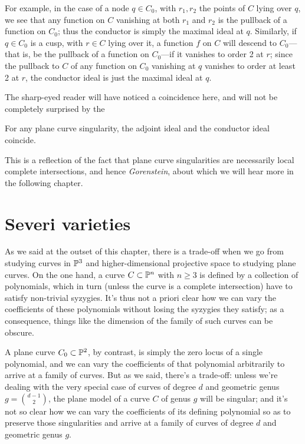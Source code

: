 For example, in the case of a node $q \in C_0$, with $r_1,r_2$ the points of $C$ lying over $q$, we see that any function on $C$ vanishing at both $r_1$ and $r_2$ is the pullback of a function on $C_0$; thus the conductor is simply the maximal ideal at $q$. Similarly, if $q \in C_0$ is a cusp, with $r \in C$ lying over it, a function $f$ on $C$ will descend to $C_0$---that is, be the pullback of a function on $C_0$---if it vanishes to order 2 at $r$; since the pullback to $C$ of any function on $C_0$ vanishing at $q$ vanishes to order at least 2 at $r$, the conductor ideal is just the maximal ideal at $q$.

The sharp-eyed reader will have noticed a coincidence here, and will not be completely surprised by the

\begin{theorem}
For any plane curve singularity, the adjoint ideal and the conductor ideal coincide.
\end{theorem}

This is a reflection of the fact that plane curve singularities are necessarily local complete intersections, and hence \emph{Gorenstein}, about which we will hear more in the following chapter.

\section{Severi varieties}

As we said at the outset of this chapter, there is a trade-off when we go from studying curves in ${\mathbb P}^3$ and higher-dimensional projective space to studying plane curves. On the one hand, a curve $C \subset {\mathbb P}^n$ with $n \geq 3$ is defined by a collection of polynomials, which in turn (unless the curve is a complete intersection) have to satisfy non-trivial syzygies. It's thus not a priori clear how we can vary the coefficients of these polynomials without losing the syzygies they satisfy; as a consequence, things like the dimension of the family of such curves can be obscure.

A plane curve $C_0 \subset {\mathbb P}^2$, by contrast, is simply the zero locus of a single polynomial, and we can vary the coefficients of that polynomial arbitrarily to arrive at a family of curves. But as we said, there's a trade-off: unless we're dealing with the very special case of curves of degree $d$ and geometric genus $g = \binom{d-1}{2}$, the plane model of a curve $C$ of genus $g$ will be singular; and it's not so clear how we can vary the coefficients of its defining polynomial so as to preserve those singularities and arrive at a family of curves of degree $d$ and geometric genus $g$.

